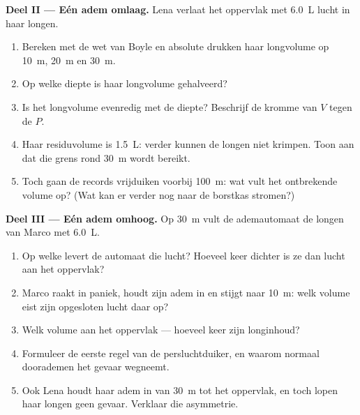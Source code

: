 \begin{problem}
\medskip
\noindent\textbf{Deel II --- Eén adem omlaag.}
Lena verlaat het oppervlak met \qty{6.0}{L} lucht in haar longen.
\begin{enumerate}[resume]
  \item Bereken met de wet van Boyle en absolute drukken haar longvolume
        op \qty{10}{m}, \qty{20}{m} en \qty{30}{m}.
  \item Op welke diepte is haar longvolume gehalveerd?
  \item Is het longvolume evenredig met de diepte? Beschrijf de kromme
        van $V$ tegen de  $P$.
  \item Haar residuvolume is \qty{1.5}{L}: verder kunnen de longen niet
        krimpen. Toon aan dat die grens rond \qty{30}{m} wordt bereikt.
  \item Toch gaan de records vrijduiken voorbij \qty{100}{m}: wat vult
        het ontbrekende volume op? (Wat kan er verder nog naar de
        borstkas stromen?)
\end{enumerate}

\medskip
\noindent\textbf{Deel III --- Eén adem omhoog.}
Op \qty{30}{m} vult de ademautomaat de longen van Marco met
\qty{6.0}{L}.
\begin{enumerate}[resume]
  \item Op welke  levert de automaat die lucht? Hoeveel keer dichter
        is ze dan lucht aan het oppervlak?
  \item Marco raakt in paniek, houdt zijn adem in en stijgt naar
        \qty{10}{m}: welk volume eist zijn opgesloten lucht daar op?
  \item Welk volume aan het oppervlak --- hoeveel keer zijn
        longinhoud?
  \item Formuleer de eerste regel van de persluchtduiker, en waarom
        normaal doorademen het gevaar wegneemt.
  \item Ook Lena houdt haar adem in van \qty{30}{m} tot het oppervlak,
        en toch lopen haar longen geen gevaar. Verklaar die asymmetrie.
\end{enumerate}


\end{problem}
